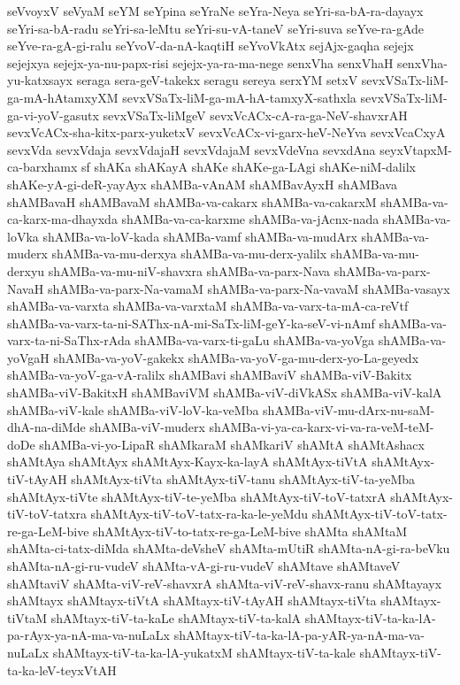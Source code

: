 {seVvoyxV
seVyaM
seYM
seYpina
seYraNe
seYra-Neya
seYri-sa-bA-ra-dayayx
seYri-sa-bA-radu
seYri-sa-leMtu
seYri-su-vA-taneV
seYri-suva
seYve-ra-gAde
seYve-ra-gA-gi-ralu
seYvoV-da-nA-kaqtiH
seYvoVkAtx
sejAjx-gaqha
sejejx
sejejxya
sejejx-ya-nu-papx-risi
sejejx-ya-ra-ma-nege
senxVha
senxVhaH
senxVha-yu-katxsayx
seraga
sera-geV-takekx
seragu
sereya
serxYM
setxV
sevxVSaTx-liM-ga-mA-hAtamxyXM
sevxVSaTx-liM-ga-mA-hA-tamxyX-sathxla
sevxVSaTx-liM-ga-vi-yoV-gasutx
sevxVSaTx-liMgeV
sevxVcACx-cA-ra-ga-NeV-shavxrAH
sevxVcACx-sha-kitx-parx-yuketxV
sevxVcACx-vi-garx-heV-NeYva
sevxVcaCxyA
sevxVda
sevxVdaja
sevxVdajaH
sevxVdajaM
sevxVdeVna
sevxdAna
seyxVtapxM-ca-barxhamx
sf
shAKa
shAKayA
shAKe
shAKe-ga-LAgi
shAKe-niM-dalilx
shAKe-yA-gi-deR-yayAyx
shAMBa-vAnAM
shAMBavAyxH
shAMBava
shAMBavaH
shAMBavaM
shAMBa-va-cakarx
shAMBa-va-cakarxM
shAMBa-va-ca-karx-ma-dhayxda
shAMBa-va-ca-karxme
shAMBa-va-jAcnx-nada
shAMBa-va-loVka
shAMBa-va-loV-kada
shAMBa-vamf
shAMBa-va-mudArx
shAMBa-va-muderx
shAMBa-va-mu-derxya
shAMBa-va-mu-derx-yalilx
shAMBa-va-mu-derxyu
shAMBa-va-mu-niV-shavxra
shAMBa-va-parx-Nava
shAMBa-va-parx-NavaH
shAMBa-va-parx-Na-vamaM
shAMBa-va-parx-Na-vavaM
shAMBa-vasayx
shAMBa-va-varxta
shAMBa-va-varxtaM
shAMBa-va-varx-ta-mA-ca-reVtf
shAMBa-va-varx-ta-ni-SAThx-nA-mi-SaTx-liM-geY-ka-seV-vi-nAmf
shAMBa-va-varx-ta-ni-SaThx-rAda
shAMBa-va-varx-ti-gaLu
shAMBa-va-yoVga
shAMBa-va-yoVgaH
shAMBa-va-yoV-gakekx
shAMBa-va-yoV-ga-mu-derx-yo-La-geyedx
shAMBa-va-yoV-ga-vA-ralilx
shAMBavi
shAMBaviV
shAMBa-viV-Bakitx
shAMBa-viV-BakitxH
shAMBaviVM
shAMBa-viV-diVkASx
shAMBa-viV-kalA
shAMBa-viV-kale
shAMBa-viV-loV-ka-veMba
shAMBa-viV-mu-dArx-nu-saM-dhA-na-diMde
shAMBa-viV-muderx
shAMBa-vi-ya-ca-karx-vi-va-ra-veM-teM-doDe
shAMBa-vi-yo-LipaR
shAMkaraM
shAMkariV
shAMtA
shAMtAshacx
shAMtAya
shAMtAyx
shAMtAyx-Kayx-ka-layA
shAMtAyx-tiVtA
shAMtAyx-tiV-tAyAH
shAMtAyx-tiVta
shAMtAyx-tiV-tanu
shAMtAyx-tiV-ta-yeMba
shAMtAyx-tiVte
shAMtAyx-tiV-te-yeMba
shAMtAyx-tiV-toV-tatxrA
shAMtAyx-tiV-toV-tatxra
shAMtAyx-tiV-toV-tatx-ra-ka-le-yeMdu
shAMtAyx-tiV-toV-tatx-re-ga-LeM-bive
shAMtAyx-tiV-to-tatx-re-ga-LeM-bive
shAMta
shAMtaM
shAMta-ci-tatx-diMda
shAMta-deVsheV
shAMta-mUtiR
shAMta-nA-gi-ra-beVku
shAMta-nA-gi-ru-vudeV
shAMta-vA-gi-ru-vudeV
shAMtave
shAMtaveV
shAMtaviV
shAMta-viV-reV-shavxrA
shAMta-viV-reV-shavx-ranu
shAMtayayx
shAMtayx
shAMtayx-tiVtA
shAMtayx-tiV-tAyAH
shAMtayx-tiVta
shAMtayx-tiVtaM
shAMtayx-tiV-ta-kaLe
shAMtayx-tiV-ta-kalA
shAMtayx-tiV-ta-ka-lA-pa-rAyx-ya-nA-ma-va-nuLaLx
shAMtayx-tiV-ta-ka-lA-pa-yAR-ya-nA-ma-va-nuLaLx
shAMtayx-tiV-ta-ka-lA-yukatxM
shAMtayx-tiV-ta-kale
shAMtayx-tiV-ta-ka-leV-teyxVtAH
}
